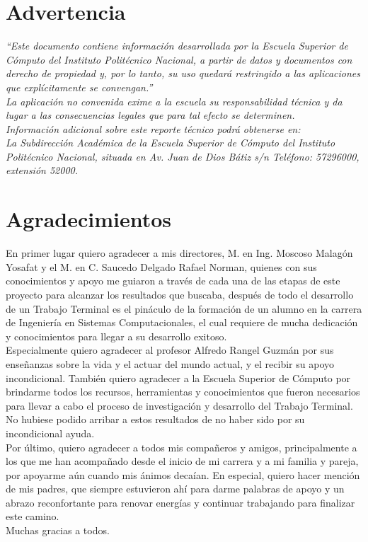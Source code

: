 \documentclass[11pt,letter]{report}
\begin{document}
\newpage	
\section*{Advertencia}
\vfill
\textit{“Este documento contiene información desarrollada por la Escuela Superior de Cómputo del Instituto Politécnico Nacional, a partir de datos y documentos con derecho de propiedad y, por lo tanto, su uso quedará restringido a las aplicaciones que explícitamente se convengan.”
\\
La aplicación no convenida exime a la escuela su responsabilidad técnica y da lugar a las consecuencias legales que para tal efecto se determinen. 
\\
Información adicional sobre este reporte técnico podrá obtenerse en: 
\\
La Subdirección Académica de la Escuela Superior de Cómputo del Instituto Politécnico Nacional, situada en Av. Juan de Dios Bátiz s/n Teléfono: 57296000, extensión 52000.}
\vfill

\newpage
\section*{Agradecimientos}
\vfill
En primer lugar quiero agradecer a mis directores, M. en Ing. Moscoso Malagón Yosafat y el M. en C. Saucedo Delgado Rafael Norman, quienes con sus conocimientos y apoyo me guiaron a través de cada una de las etapas de este proyecto para alcanzar los resultados que buscaba, después de todo el  desarrollo de un Trabajo Terminal es el pináculo de  la formación de un alumno en la carrera de Ingeniería en Sistemas Computacionales, el cual requiere de mucha dedicación y conocimientos para llegar a su desarrollo exitoso.
\\
\newline
Especialmente quiero agradecer al profesor Alfredo Rangel Guzmán por sus enseñanzas sobre la vida y el actuar del mundo actual, y el recibir su apoyo incondicional.
También quiero agradecer a la Escuela Superior de Cómputo por brindarme todos los recursos, herramientas y conocimientos que fueron necesarios para llevar a cabo el proceso de investigación y desarrollo del Trabajo Terminal. No hubiese podido arribar a estos resultados de no haber sido por su incondicional ayuda.
\\
\newline
Por último, quiero agradecer a todos mis compañeros y amigos, principalmente a los que me han acompañado desde el inicio de mi carrera y a mi familia y pareja, por apoyarme aún cuando mis ánimos decaían. En especial, quiero hacer mención de mis padres, que siempre estuvieron ahí para darme palabras de apoyo y un abrazo reconfortante para renovar energías y continuar trabajando para finalizar este camino.
\\
\newline
Muchas gracias a todos.
\\
\end{document}
